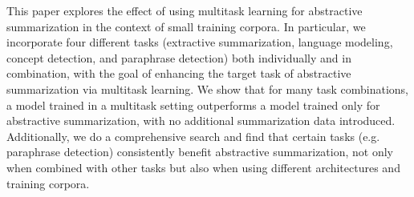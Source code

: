 This paper explores the effect of using multitask learning for abstractive summarization in the context of small training corpora. In particular, we incorporate four different tasks (extractive summarization, language modeling, concept detection, and paraphrase detection) both individually and in combination, with the goal of enhancing the target task of abstractive summarization via multitask learning. We show that for many task combinations, a model trained in a multitask setting  outperforms  a model trained only for abstractive summarization, with no additional summarization data introduced. Additionally, we do a comprehensive search and find that certain tasks (e.g. paraphrase detection) consistently benefit abstractive summarization, not only when combined with other tasks but also when using different architectures and training corpora.
